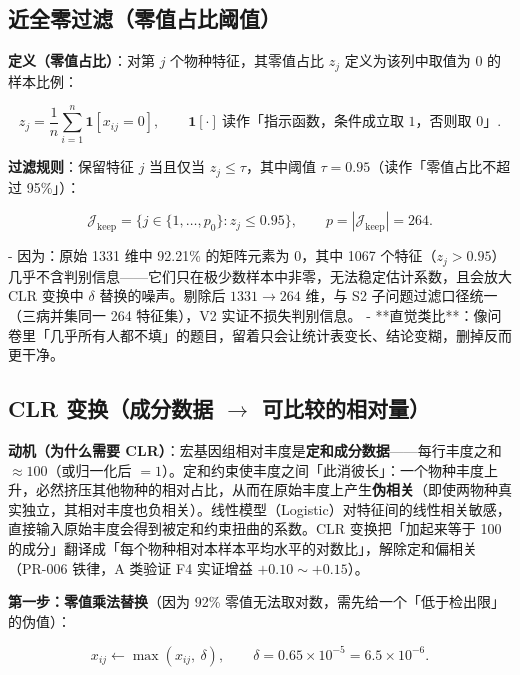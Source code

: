 \documentclass{internal-report}
\begin{document}
\subsection{近全零过滤（零值占比阈值）}
\label{sec:filter}

\textbf{定义（零值占比）}：对第 $j$ 个物种特征，其零值占比 $z_j$ 定义为该列中取值为 0 的样本比例：

\begin{equation}
  z_j = \frac{1}{n}\sum_{i=1}^{n}\mathbf{1}[x_{ij}=0],
  \qquad
  \mathbf{1}[\cdot]\ \text{读作「指示函数，条件成立取 1，否则取 0」}.
  \label{eq:zerofrac}
\end{equation}

\textbf{过滤规则}：保留特征 $j$ 当且仅当 $z_j \le \tau$，其中阈值 $\tau = 0.95$（读作「零值占比不超过 95\%」）：

\begin{equation}
  \mathcal{J}_{\text{keep}} = \big\{ j \in \{1,\dots,p_0\} : z_j \le 0.95 \big\},
  \qquad
  p = |\mathcal{J}_{\text{keep}}| = 264.
  \label{eq:filter}
\end{equation}

- 因为：原始 1331 维中 92.21\% 的矩阵元素为 0，其中 1067 个特征（$z_j>0.95$）几乎不含判别信息——它们只在极少数样本中非零，无法稳定估计系数，且会放大 CLR 变换中 $\delta$ 替换的噪声。剔除后 $1331\to264$ 维，与 S2 子问题过滤口径统一（三病并集同一 264 特征集），V2 实证不损失判别信息。
- **直觉类比**：像问卷里「几乎所有人都不填」的题目，留着只会让统计表变长、结论变糊，删掉反而更干净。

\subsection{CLR 变换（成分数据 $\to$ 可比较的相对量）}
\label{sec:clr}

\textbf{动机（为什么需要 CLR）}：宏基因组相对丰度是\textbf{定和成分数据}——每行丰度之和 $\approx 100$（或归一化后 $=1$）。定和约束使丰度之间「此消彼长」：一个物种丰度上升，必然挤压其他物种的相对占比，从而在原始丰度上产生\textbf{伪相关}（即使两物种真实独立，其相对丰度也负相关）。线性模型（Logistic）对特征间的线性相关敏感，直接输入原始丰度会得到被定和约束扭曲的系数。CLR 变换把「加起来等于 100 的成分」翻译成「每个物种相对本样本平均水平的对数比」，解除定和偏相关（PR-006 铁律，A 类验证 F4 实证增益 $+0.10\sim+0.15$）。

\textbf{第一步：零值乘法替换}（因为 92\% 零值无法取对数，需先给一个「低于检出限」的伪值）：

\begin{equation}
  x_{ij} \leftarrow \max(x_{ij},\ \delta),
  \qquad
  \delta = 0.65 \times 10^{-5} = 6.5\times10^{-6}.
  \label{eq:zeroreplace}
\end{equation}
\end{document}
